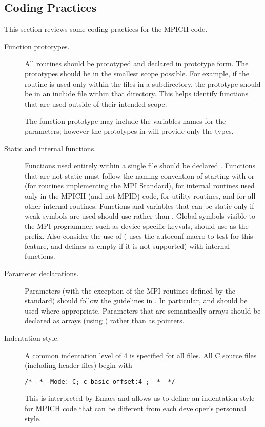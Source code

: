 \documentclass{article}
\begin{document}
\subsection{Coding Practices}
\label{sec:coding-practices}
This section reviews some coding practices for the MPICH code.

\begin{description}
\item[Function prototypes.]
All routines should be prototyped and declared in prototype form.  The
prototypes should be in the 
smallest scope possible.  For example, if the routine is used only
within the files in a subdirectory, the prototype should be in an
include file within that directory.  This helps identify functions that are
used outside of their intended scope.

The function prototype may include the variables names for the parameters;
however the prototypes in  will provide only the types.

\item[Static and internal functions.]
Functions used entirely within a single file should be declared
.  Functions that are not static must follow the naming
convention of starting with  or  (for routines
implementing the MPI Standard),  for internal routines
used only in the MPICH (and not MPID) code,  for utility
routines, and  for all
other internal routines.  
Functions and variables that can be static only if weak symbols are
used should use  rather than .
Global symbols visible to the MPI programmer, such as device-specific
keyvals, should use 
 as the 
prefix.  Also consider the use of  ( uses the
autoconf macro  to test for this feature, and
defines  as empty if it is not supported) with
internal functions.

\item[Parameter declarations.]
Parameters (with the exception of the MPI routines defined by the
standard) should follow the guidelines in 
\cite{coding-standards}.  In 
particular,  and  should be used where appropriate.
Parameters that are semantically arrays should be declared as arrays
(using \code{[]}) rather than as pointers.

\item[Indentation style.]
A common indentation level of 4 is specified for all files.
All C source files (including header files) begin with 
\begin{verbatim}
/* -*- Mode: C; c-basic-offset:4 ; -*- */
\end{verbatim}
This is interpreted by Emacs and allows us to define an
indentation style for MPICH code 
that can be different from each developer's personnal style.


\end{description}
\end{document}
